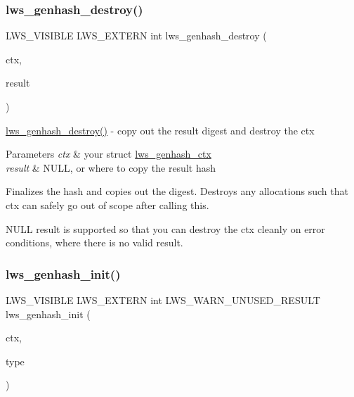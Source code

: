 \subsubsection{\texorpdfstring{lws\+\_\+genhash\+\_\+destroy()}{lws\_genhash\_destroy()}}
{\footnotesize\ttfamily L\+W\+S\+\_\+\+V\+I\+S\+I\+B\+LE L\+W\+S\+\_\+\+E\+X\+T\+E\+RN int lws\+\_\+genhash\+\_\+destroy (\begin{DoxyParamCaption}\item[{struct \hyperlink{structlws__genhash__ctx}{lws\+\_\+genhash\+\_\+ctx} $\ast$}]{ctx,  }\item[{void $\ast$}]{result }\end{DoxyParamCaption})}

\hyperlink{group__generic_gabdecb2d2658f28ba618734981d071fc2}{lws\+\_\+genhash\+\_\+destroy()} -\/ copy out the result digest and destroy the ctx


\begin{DoxyParams}{Parameters}
{\em ctx} & your struct \hyperlink{structlws__genhash__ctx}{lws\+\_\+genhash\+\_\+ctx} \\
\hline
{\em result} & N\+U\+LL, or where to copy the result hash\\
\hline
\end{DoxyParams}
Finalizes the hash and copies out the digest. Destroys any allocations such that ctx can safely go out of scope after calling this.

N\+U\+LL result is supported so that you can destroy the ctx cleanly on error conditions, where there is no valid result. \mbox{\label{group__generic_ga9a5deb937ea81ee82d4a7779af9e7120}} 
\subsubsection{\texorpdfstring{lws\+\_\+genhash\+\_\+init()}{lws\_genhash\_init()}}
{\footnotesize\ttfamily L\+W\+S\+\_\+\+V\+I\+S\+I\+B\+LE L\+W\+S\+\_\+\+E\+X\+T\+E\+RN int L\+W\+S\+\_\+\+W\+A\+R\+N\+\_\+\+U\+N\+U\+S\+E\+D\+\_\+\+R\+E\+S\+U\+LT lws\+\_\+genhash\+\_\+init (\begin{DoxyParamCaption}\item[{struct \hyperlink{structlws__genhash__ctx}{lws\+\_\+genhash\+\_\+ctx} $\ast$}]{ctx,  }\item[{int}]{type }\end{DoxyParamCaption})}

